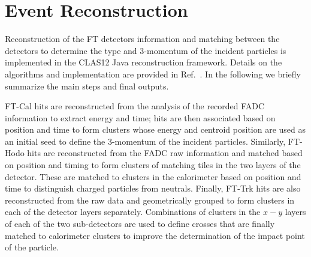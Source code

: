 \section{Event Reconstruction}

Reconstruction of the FT detectors information and matching between the detectors to determine the type and
3-momentum of the incident particles is implemented in the CLAS12 Java reconstruction framework. Details on
the algorithms and implementation are provided in Ref.~\cite{reconstruction}. In the following we briefly summarize
the main steps and final outputs.

FT-Cal hits are reconstructed from the analysis of the recorded FADC information to extract energy and time;
hits are then associated based on position and time to form clusters whose energy and centroid position are used
as an initial seed to define the 3-momentum of the incident particles. Similarly, FT-Hodo hits are reconstructed
from the FADC raw information and matched based on position and timing to form clusters of matching tiles in the
two layers of the detector. These are matched to clusters in the calorimeter based on position and time to distinguish
charged particles from neutrals. Finally, FT-Trk hits are also reconstructed from the raw data and geometrically
grouped to form clusters in each of the detector layers separately. Combinations of clusters in the $x-y$ layers of
each of the two sub-detectors are used to define crosses that are finally matched to calorimeter clusters to improve
the determination of the impact point of the particle.

